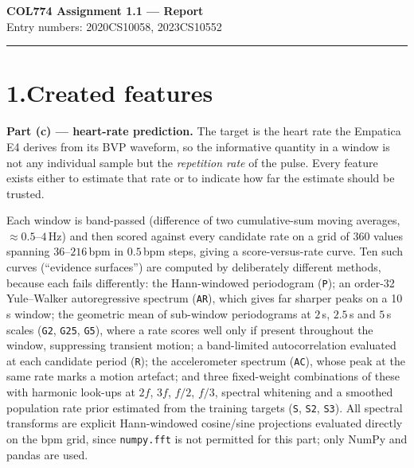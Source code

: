 \documentclass[10pt,a4paper]{article}
\newcommand{\feat}[1]{\texttt{\small #1}}
\begin{document}
\begin{center}
  {\Large\bfseries COL774 Assignment 1.1 --- Report}\\[2pt]
  {\small Entry numbers: 2020CS10058, 2023CS10552}
\end{center}
\vspace{-4pt}
\hrule
\vspace{8pt}

\section*{1.\quad Created features}

\textbf{Part (c) --- heart-rate prediction.}
The target is the heart rate the Empatica E4 derives from its BVP waveform, so the
informative quantity in a window is not any individual sample but the \emph{repetition
rate} of the pulse. Every feature exists either to estimate that rate or to indicate how
far the estimate should be trusted.

Each window is band-passed (difference of two cumulative-sum moving averages,
$\approx 0.5$--$4$\,Hz) and then scored against every candidate rate on a grid of 360
values spanning $36$--$216$\,bpm in $0.5$\,bpm steps, giving a score-versus-rate curve.
Ten such curves (``evidence surfaces'') are computed by deliberately different methods,
because each fails differently: the Hann-windowed periodogram (\feat{P}); an order-32
Yule--Walker autoregressive spectrum (\feat{AR}), which gives far sharper peaks on a
10\,s window; the geometric mean of sub-window periodograms at $2$\,s, $2.5$\,s and
$5$\,s scales (\feat{G2}, \feat{G25}, \feat{G5}), where a rate scores well only if
present throughout the window, suppressing transient motion; a band-limited
autocorrelation evaluated at each candidate period (\feat{R}); the accelerometer
spectrum (\feat{AC}), whose peak at the same rate marks a motion artefact; and three
fixed-weight combinations of these with harmonic look-ups at $2f$, $3f$, $f/2$, $f/3$,
spectral whitening and a smoothed population rate prior estimated from the training
targets (\feat{S}, \feat{S2}, \feat{S3}). All spectral transforms are explicit
Hann-windowed cosine/sine projections evaluated directly on the bpm grid, since
\texttt{numpy.fft} is not permitted for this part; only NumPy and pandas are used.
\end{document}
